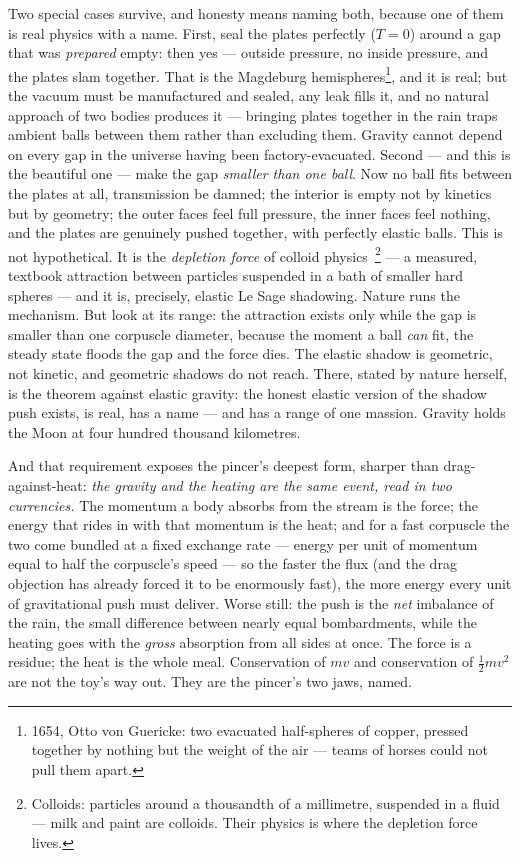 \documentclass[fontsize=11pt,paper=a4,pagesize=auto,parskip=half-]{scrbook}
\begin{document}
Two special cases survive, and honesty means naming both, because one of them is real physics with a name. First, seal the plates perfectly ($T=0$) around a gap that was \emph{prepared} empty: then yes --- outside pressure, no inside pressure, and the plates slam together. That is the Magdeburg hemispheres\footnote{1654, Otto von Guericke: two evacuated half-spheres of copper, pressed together by nothing but the weight of the air --- teams of horses could not pull them apart.}, and it is real; but the vacuum must be manufactured and sealed, any leak fills it, and no natural approach of two bodies produces it --- bringing plates together in the rain traps ambient balls between them rather than excluding them. Gravity cannot depend on every gap in the universe having been factory-evacuated. Second --- and this is the beautiful one --- make the gap \emph{smaller than one ball}. Now no ball fits between the plates at all, transmission be damned; the interior is empty not by kinetics but by geometry; the outer faces feel full pressure, the inner faces feel nothing, and the plates are genuinely pushed together, with perfectly elastic balls. This is not hypothetical. It is the \emph{depletion force} of colloid physics~\cite{asakuraoosawa1954}\footnote{Colloids: particles around a thousandth of a millimetre, suspended in a fluid --- milk and paint are colloids. Their physics is where the depletion force lives.} --- a measured, textbook attraction between particles suspended in a bath of smaller hard spheres --- and it is, precisely, elastic Le Sage shadowing. Nature runs the mechanism. But look at its range: the attraction exists only while the gap is smaller than one corpuscle diameter, because the moment a ball \emph{can} fit, the steady state floods the gap and the force dies. The elastic shadow is geometric, not kinetic, and geometric shadows do not reach. There, stated by nature herself, is the theorem against elastic gravity: the honest elastic version of the shadow push exists, is real, has a name --- and has a range of one massion. Gravity holds the Moon at four hundred thousand kilometres.

And that requirement exposes the pincer's deepest form, sharper than drag-against-heat: \emph{the gravity and the heating are the same event, read in two currencies.} The momentum a body absorbs from the stream is the force; the energy that rides in with that momentum is the heat; and for a fast corpuscle the two come bundled at a fixed exchange rate --- energy per unit of momentum equal to half the corpuscle's speed --- so the faster the flux (and the drag objection has already forced it to be enormously fast), the more energy every unit of gravitational push must deliver. Worse still: the push is the \emph{net} imbalance of the rain, the small difference between nearly equal bombardments, while the heating goes with the \emph{gross} absorption from all sides at once. The force is a residue; the heat is the whole meal. Conservation of $mv$ and conservation of $\tfrac{1}{2}mv^{2}$ are not the toy's way out. They are the pincer's two jaws, named.
\end{document}
